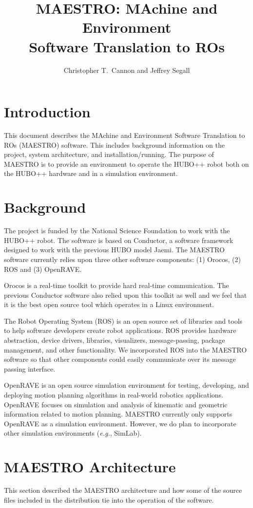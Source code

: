 \documentclass{article}
\title{MAESTRO: MAchine and Environment\\Software Translation to ROs}
\author{Christopher T.~Cannon and Jeffrey Segall}
\begin{document}
\maketitle

\section{Introduction}
This document describes the MAchine and Environment Software Translation
to ROs (MAESTRO) software. This includes background information on the
project, system architecture, and installation/running. The purpose of
MAESTRO is to provide an environment to operate the HUBO++ robot both on
the HUBO++ hardware and in a simulation environment.

\section{Background}
The project is funded by the National Science Foundation to work with
the HUBO++ robot. The software is based on Conductor, a software
framework designed to work with the previous HUBO model Jaemi.
The MAESTRO software currently relies upon three other software
components: (1) Orocos, (2) ROS and (3) OpenRAVE.

Orocos is a real-time toolkit to provide hard real-time communication.
The previous Conductor software also relied upon this toolkit as well
and we feel that it is the best open source tool which operates in a
Linux environment. 

The Robot Operating System (ROS) is an open source set of libraries and
tools to help software developers create robot applications. ROS
provides hardware abstraction, device drivers, libraries, visualizers,
message-passing, package management, and other functionality. We
incorporated ROS into the MAESTRO software so that other components
could easily communicate over its message passing interface.

OpenRAVE is an open source simulation environment for testing,
developing, and deploying motion planning algorithms in real-world
robotics applications. OpenRAVE focuses on simulation and analysis of
kinematic and geometric information related to motion planning. MAESTRO
currently only supports OpenRAVE as a simulation environment. However,
we do plan to incorporate other simulation environments (\emph{e.g.},
SimLab).

\section{MAESTRO Architecture}
This section described the MAESTRO architecture and how some of the
source files included in the distribution tie into the operation of the software.
\end{document}
